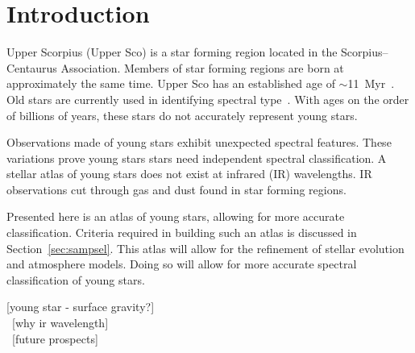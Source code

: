 \section{Introduction}
  



  
  
Upper Scorpius (Upper Sco) is a star forming region located in 
the Scorpius–Centaurus Association.  Members of star forming regions 
are born at approximately the same time.  Upper Sco has an established age 
of $\sim$11~Myr~\cite{Pecaut_2012}.  Old stars are currently used in 
identifying spectral type~\cite{Rayner_2009, Ivanov_2004}.  With ages on 
the order of billions of years, these stars do not accurately represent 
young stars.



Observations made of young stars exhibit unexpected 
spectral features.  These variations prove young stars 
stars need independent spectral classification.  A stellar 
atlas of young stars does not exist at infrared (IR) 
wavelengths.  IR observations cut through gas and dust found 
in star forming regions.



Presented here is an atlas of young stars, allowing for 
more accurate classification.  Criteria required in building such 
an atlas is discussed in Section~\ref{sec:sampsel}.  
This atlas will allow for the refinement of stellar evolution and 
atmosphere models.  Doing so will allow for more accurate spectral 
classification of young stars.


\iffalse
[Need to add introduction to Upper Sco here.]\\
~[start at same level as UROP - difference between old and young stars]\\
~[why do we need young atlas]\\
\fi
[young star - surface gravity?]\\
~[why ir wavelength]\\
~[future prospects]